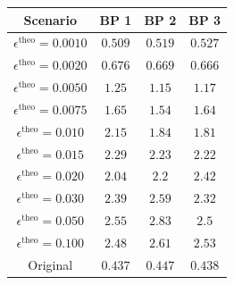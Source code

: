 \begin{tabular}{|c||c|c|c|}
\hline
Scenario & BP 1 & BP 2 & BP 3\\
\hline\hline
$\epsilon^{\text{theo}}=0.0010$ & $0.509$ & $0.519$ & $0.527$\\\hline
$\epsilon^{\text{theo}}=0.0020$ & $0.676$ & $0.669$ & $0.666$\\\hline
$\epsilon^{\text{theo}}=0.0050$ & $1.25$ & $1.15$ & $1.17$\\\hline
$\epsilon^{\text{theo}}=0.0075$ & $1.65$ & $1.54$ & $1.64$\\\hline
$\epsilon^{\text{theo}}=0.010$ & $2.15$ & $1.84$ & $1.81$\\\hline
$\epsilon^{\text{theo}}=0.015$ & $2.29$ & $2.23$ & $2.22$\\\hline
$\epsilon^{\text{theo}}=0.020$ & $2.04$ & $2.2$ & $2.42$\\\hline
$\epsilon^{\text{theo}}=0.030$ & $2.39$ & $2.59$ & $2.32$\\\hline
$\epsilon^{\text{theo}}=0.050$ & $2.55$ & $2.83$ & $2.5$\\\hline
$\epsilon^{\text{theo}}=0.100$ & $2.48$ & $2.61$ & $2.53$\\\hline
Original & $0.437$ & $0.447$ & $0.438$\\
\hline
\end{tabular}
